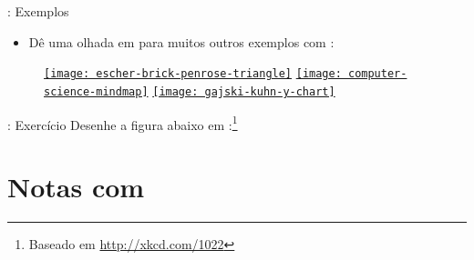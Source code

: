 \documentclass{beamer}
\begin{document}
\begin{frame}[fragile]{\insertsection: Exemplos}
\begin{itemize}
  \item Dê uma olhada em  para muitos outros exemplos com \tikzname{}:
\end{itemize}
\begin{figure}
  \href{http://texample.net/tikz/examples/escher-brick-penrose-triangle/}{\texttt{[image: escher-brick-penrose-triangle]}}
  \href{http://texample.net/tikz/examples/computer-science-mindmap/}{\texttt{[image: computer-science-mindmap]}}
  \href{http://texample.net/tikz/examples/gajski-kuhn-y-chart/}{\texttt{[image: gajski-kuhn-y-chart]}}
\end{figure}
\end{frame}

\begin{frame}[fragile]{\insertsection: Exercício}
  Desenhe a figura abaixo em \tikzname:\footnote{Baseado em \url{http://xkcd.com/1022}}
\begin{figure}
  
\end{figure}
\end{frame}

\section{Notas com \protect{}}
\end{document}
